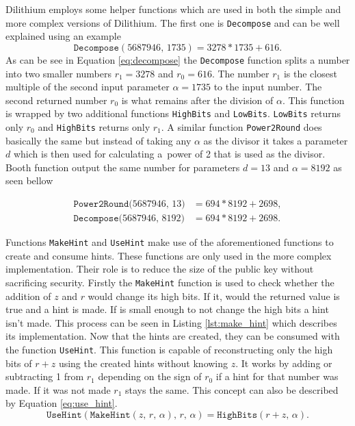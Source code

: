 Dilithium employs some helper functions which are used in both the simple and more complex versions of Dilithium. The first one is \texttt{Decompose} and can be well explained using an example
\begin{equation}
  \label{eq:decompose}
  \mathrm{\texttt{Decompose}}(5687946,\,1735)=3278*1735+616.
\end{equation}
\noindent As can be see in Equation \ref{eq:decompose} the \texttt{Decompose} function splits a number into two smaller numbers $r_1=3278$ and $r_0=616$. The number $r_1$ is the closest multiple of the second input parameter $\alpha=1735$ to the input number. The second returned number $r_0$ is what remains after the division of $\alpha$. This function is wrapped by two additional functions \texttt{HighBits} and \texttt{LowBits}. \texttt{LowBits} returns only $r_0$ and \texttt{HighBits} returns only $r_1$. A similar function \texttt{Power2Round} does basically the same but instead of taking any $\alpha$ as the divisor it takes a parameter $d$ which is then used for calculating a~power of 2 that is used as the divisor. Booth function output the same number for parameters $d=13$ and $\alpha=8192$ as seen bellow

\begin{align}
  \mathrm{\texttt{Power2Round}}(5687946,\,13\mathrm) & =694*8192+2698, \\
  \mathrm{\texttt{Decompose}}(5687946,\,8192\mathrm) & =694*8192+2698.
\end{align}

Functions \texttt{MakeHint} and \texttt{UseHint} make use of the aforementioned functions to create and consume hints. These functions are only used in the more complex implementation. Their role is to reduce the size of the public key without sacrificing security. Firstly the \texttt{MakeHint} function is used to check whether the addition of $z$ and $r$ would change its high bits. If it, would the returned value is true and a hint is made. If is small enough to not change the high bits a hint isn't made. This process can be seen in Listing \ref{lst:make_hint} which describes its implementation.
\newpage
{}
\noindent Now that the hints are created, they can be consumed with the function \texttt{UseHint}. This function is capable of reconstructing only the high bits of $r+z$ using the created hints without knowing $z$. It works by adding or subtracting 1 from $r_1$ depending on the sign of $r_0$ if a hint for that number was made. If it was not made $r_1$ stays the same. This concept can also be described by Equation \ref{eq:use_hint}.
\begin{equation}
  \label{eq:use_hint}
  \mathrm{\texttt{UseHint}}(\mathrm{\texttt{MakeHint}}(z,\,r,\,\alpha),\,r,\,\alpha)=\mathrm{\texttt{HighBits}}(r+z,\,\alpha).
\end{equation}
